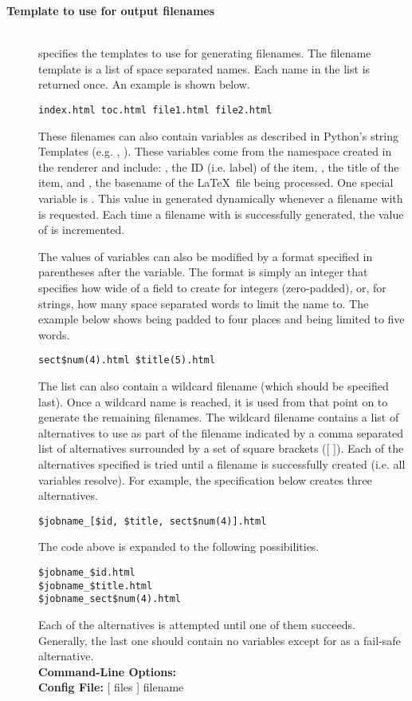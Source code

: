 \documentclass{manual}
\newcommand{\optval}[1]{\textrm{\textit{#1}}}
\newenvironment{configuration}[1]{%
    \newcommand{\default}[1]{\hfill\\\textbf{Default:} ##1}%
    \newcommand{\config}[2]{\hfill\\\textbf{Config File:} [ ##1 ] ##2}%
    \newcommand{\options}[1]{\hfill\\\textbf{Command-Line Options:} %
                                     \texttt{##1}}%
    \begin{description}
    \item[\textbf{#1}] \hfill\\
}{\end{description}}
\begin{document}
\begin{configuration}{Template to use for output filenames}
specifies the templates to use for generating filenames.  
The filename template is a list of space separated names.  Each name 
in the list is returned once.  An example is shown below.

\begin{verbatim}
index.html toc.html file1.html file2.html
\end{verbatim}

These filenames can also contain variables as described in 
Python's string Templates (e.g. , ).  These variables
come from the namespace created in the renderer and include:
, the ID (i.e. label) of the item, , the title of the
item, and , the basename of the \LaTeX\ file being processed.  
One special variable is .  This value in generated dynamically 
whenever a filename with  is requested.  Each time a filename 
with  is successfully generated, the value of 
is incremented.

The values of variables can also be modified by a format specified
in parentheses after the variable.  The format is simply an integer
that specifies how wide of a field to create for integers 
(zero-padded), or, for strings, how many space separated words
to limit the name to.  The example below shows  being padded
to four places and  being limited to five words.

\begin{verbatim}
sect$num(4).html $title(5).html
\end{verbatim}

The list can also contain a wildcard filename (which should be 
specified last).  Once a wildcard name is reached, it is 
used from that point on to generate the remaining filenames.  
The wildcard filename contains a list of alternatives to use as
part of the filename indicated by a comma separated list of 
alternatives surrounded by a set of square brackets ([ ]).
Each of the alternatives specified is tried until a filename is
successfully created (i.e. all variables resolve).  For example,
the specification below creates three alternatives.

\begin{verbatim}
$jobname_[$id, $title, sect$num(4)].html
\end{verbatim}

The code above is expanded to the following possibilities.

\begin{verbatim}
$jobname_$id.html
$jobname_$title.html
$jobname_sect$num(4).html
\end{verbatim}

Each of the alternatives is attempted until one of them succeeds.
Generally, the last one should contain no variables except for
 as a fail-safe alternative.
\options{\longprogramopt{filename=\optval{string}}}
\config{files}{filename}
\end{configuration}
\end{document}
